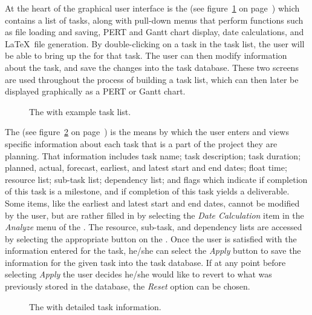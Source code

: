 At the heart of the graphical user interface is the \pscreen\/ (see
figure~\ref{project-screen} on page~\pageref{project-screen}) which
contains a list of tasks, along with pull-down menus that perform
functions such as file loading and saving, PERT and Gantt chart
display, date calculations, and \LaTeX\ file generation.  By
double-clicking on a task in the task list, the user will be able to
bring up the \tiscreen\/ for that task.  The user can then modify
information about the task, and save the changes into the task
database.  These two screens are used throughout the process of
building a task list, which can then later be displayed graphically as
a PERT or Gantt chart.

\begin{figure}
\centering
\centerline{}
\caption[Project Screen]{\label{project-screen} The \pscreen\/
with example task list.}
\end{figure}

The \tiscreen\/ (see figure~\ref{task-info-screen} on
page~\pageref{task-info-screen}) is the means by which the user enters
and views specific information about each task that is a part of the
project they are planning.  That information includes task name; task
description; task duration; planned, actual, forecast, earliest, and
latest start and end dates; float time; resource list; sub-task list;
dependency list; and flags which indicate if completion of this task
is a milestone, and if completion of this task yields a deliverable.
Some items, like the earliest and latest start and end dates, cannot
be modified by the user, but are rather filled in by selecting the
{\em Date Calculation}\/ item in the {\em Analyze}\/ menu of the
\pscreen.  The resource, sub-task, and dependency lists are accessed
by selecting the appropriate button on the \tiscreen.  Once the user
is satisfied with the information entered for the task, he/she can
select the {\em Apply}\/ button to save the information for the given
task into the task database.  If at any point before selecting {\em
Apply}\/ the user decides he/she would like to revert to what was
previously stored in the database, the {\em Reset}\/ option can be
chosen.

\begin{figure}
\centering
\centerline{}
\caption[Task Information Screen]{\label{task-info-screen} The
\tiscreen\/ with detailed task information.}
\end{figure}

